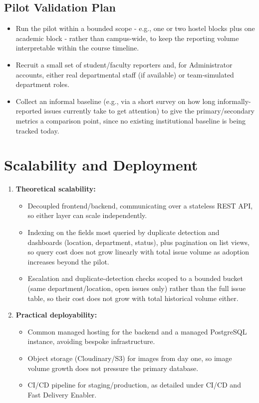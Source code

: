 \documentclass[11pt,a4paper]{article}
\begin{document}
\subsection{Pilot Validation Plan}
\label{sec:pilot-validation}
\begin{itemize}[leftmargin=0.7cm]
  \item Run the pilot within a bounded scope - e.g., one or two hostel
    blocks plus one academic block - rather than campus-wide, to keep
    the reporting volume interpretable within the course timeline.
  \item Recruit a small set of student/faculty reporters and, for
    Administrator accounts, either real departmental staff (if
    available) or team-simulated department roles.
  \item Collect an informal baseline (e.g., via a short survey on how
    long informally-reported issues currently take to get attention) to
    give the primary/secondary metrics a comparison point, since no
    existing institutional baseline is being tracked today.
\end{itemize}



\section{Scalability and Deployment}

\begin{enumerate}[leftmargin=0.7cm]
  \item \textbf{Theoretical scalability:}
    \begin{itemize}[leftmargin=0.7cm]
      \item Decoupled frontend/backend, communicating over a stateless
        REST API, so either layer can scale independently.
      \item Indexing on the fields most queried by duplicate detection
        and dashboards (location, department, status), plus pagination
        on list views, so query cost does not grow linearly with total
        issue volume as adoption increases beyond the pilot.
      \item Escalation and duplicate-detection checks scoped to a
        bounded bucket (same department/location, open issues only)
        rather than the full issue table, so their cost does not grow
        with total historical volume either.
    \end{itemize}
  \item \textbf{Practical deployability:}
    \begin{itemize}[leftmargin=0.7cm]
      \item Common managed hosting for the backend and a managed
        PostgreSQL instance, avoiding bespoke infrastructure.
      \item Object storage (Cloudinary/S3) for images from day one, so
        image volume growth does not pressure the primary database.
      \item CI/CD pipeline for staging/production, as detailed under
        CI/CD and Fast Delivery Enabler.
    \end{itemize}
\end{enumerate}
\end{document}
